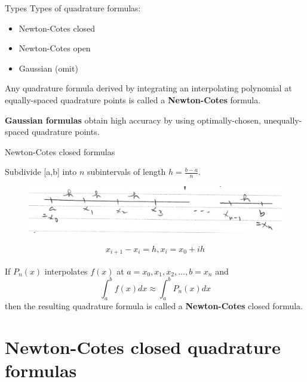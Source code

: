 \documentclass[12pt]{beamer}
\begin{document}
\begin{frame}{Types} 
Types of quadrature formulas: 
\begin{itemize} 
\item Newton-Cotes closed 
\item Newton-Cotes open 
\item Gaussian (omit) 
\end{itemize} 

Any quadrature formula derived by integrating an interpolating polynomial at equally-spaced quadrature points is called a {\bf Newton-Cotes} formula. 

{\bf Gaussian formulas} obtain high accuracy by using optimally-chosen, unequally-spaced quadrature points. 
\end{frame}

\begin{frame}{Newton-Cotes closed formulas} 

Subdivide [a,b] into $n$ subintervals of length 
$h = \frac{b-a}{n}$. 


\begin{figure} 
  \centering
  \includegraphics[scale=0.4]{linear_step_size}
  \label{fig:linear}
\end{figure}

\begin{align*} 
x_{i+1} - x_{i} = h, x_i = x_0 + ih 
\end{align*} 

If $P_n(x)$ interpolates $f(x)$ at $a=x_0, x_1, x_2, \dots, b=x_n$ 
and 
\[
\int_{a}^{b} f(x)dx \approx \int_{a}^{b} P_n(x)dx 
\]
\noindent 
then the resulting quadrature formula is called a {\bf Newton-Cotes} closed formula. 
\end{frame} 


\section{Newton-Cotes closed quadrature formulas} 
\end{document}

